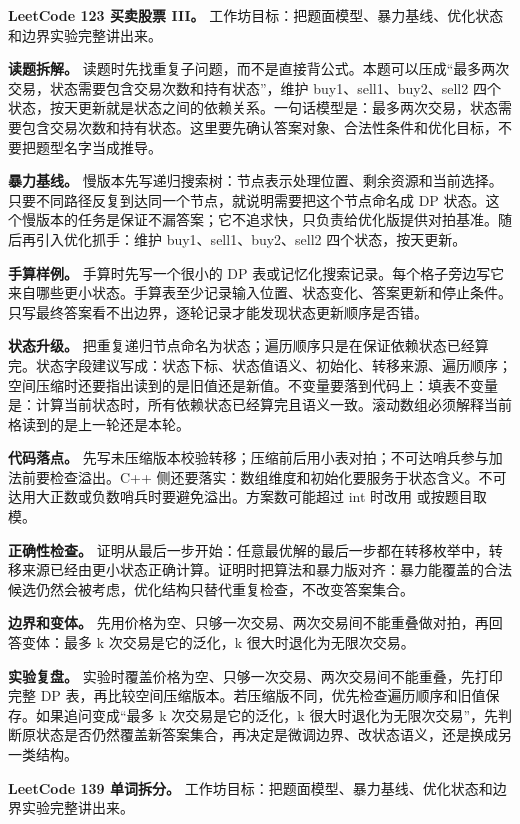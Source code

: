 \noindent\textbf{LeetCode 123 买卖股票 III。} 工作坊目标：把题面模型、暴力基线、优化状态和边界实验完整讲出来。

\textbf{读题拆解。} 读题时先找重复子问题，而不是直接背公式。本题可以压成“最多两次交易，状态需要包含交易次数和持有状态”，维护 buy1、sell1、buy2、sell2 四个状态，按天更新就是状态之间的依赖关系。一句话模型是：最多两次交易，状态需要包含交易次数和持有状态。这里要先确认答案对象、合法性条件和优化目标，不要把题型名字当成推导。

\textbf{暴力基线。} 慢版本先写递归搜索树：节点表示处理位置、剩余资源和当前选择。只要不同路径反复到达同一个节点，就说明需要把这个节点命名成 DP 状态。这个慢版本的任务是保证不漏答案；它不追求快，只负责给优化版提供对拍基准。随后再引入优化抓手：维护 buy1、sell1、buy2、sell2 四个状态，按天更新。

\textbf{手算样例。} 手算时先写一个很小的 DP 表或记忆化搜索记录。每个格子旁边写它来自哪些更小状态。手算表至少记录输入位置、状态变化、答案更新和停止条件。只写最终答案看不出边界，逐轮记录才能发现状态更新顺序是否错。

\textbf{状态升级。} 把重复递归节点命名为状态；遍历顺序只是在保证依赖状态已经算完。状态字段建议写成：状态下标、状态值语义、初始化、转移来源、遍历顺序；空间压缩时还要指出读到的是旧值还是新值。不变量要落到代码上：填表不变量是：计算当前状态时，所有依赖状态已经算完且语义一致。滚动数组必须解释当前格读到的是上一轮还是本轮。

\textbf{代码落点。} 先写未压缩版本校验转移；压缩前后用小表对拍；不可达哨兵参与加法前要检查溢出。C++ 侧还要落实：数组维度和初始化要服务于状态含义。不可达用大正数或负数哨兵时要避免溢出。方案数可能超过 int 时改用  或按题目取模。

\textbf{正确性检查。} 证明从最后一步开始：任意最优解的最后一步都在转移枚举中，转移来源已经由更小状态正确计算。证明时把算法和暴力版对齐：暴力能覆盖的合法候选仍然会被考虑，优化结构只替代重复检查，不改变答案集合。

\textbf{边界和变体。} 先用价格为空、只够一次交易、两次交易间不能重叠做对拍，再回答变体：最多 k 次交易是它的泛化，k 很大时退化为无限次交易。

\textbf{实验复盘。} 实验时覆盖价格为空、只够一次交易、两次交易间不能重叠，先打印完整 DP 表，再比较空间压缩版本。若压缩版不同，优先检查遍历顺序和旧值保存。如果追问变成“最多 k 次交易是它的泛化，k 很大时退化为无限次交易”，先判断原状态是否仍然覆盖新答案集合，再决定是微调边界、改状态语义，还是换成另一类结构。

\noindent\textbf{LeetCode 139 单词拆分。} 工作坊目标：把题面模型、暴力基线、优化状态和边界实验完整讲出来。

